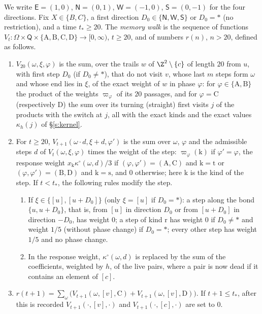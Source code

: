 We write $\mathsf E = (1, 0)$, $\mathsf N = (0, 1)$, $\mathsf W = (-1, 0)$, $\mathsf S = (0, -1)$ for the four directions. Fix $X \in \{B, C\}$, a first direction $D_0 \in \{\mathsf N, \mathsf W, \mathsf S\}$ or $D_0 = \ast$ (no restriction), and a time $t_* \ge 20$. The \emph{memory walk} is the sequence of functions $V_t \colon \Omega \times \mathsf Q \times \{\mathrm A, \mathrm B, \mathrm C, \mathrm D\} \to [0, \infty)$, $t \ge 20$, and of numbers $r(n)$, $n > 20$, defined as follows.
\begin{enumerate}
\item[(I)] $V_{20}(\omega, \xi, \varphi)$ is the sum, over the trails $w$ of $\Z^2 \setminus \{c\}$ of length $20$ from $u$, with first step $D_0$ (if $D_0 \neq \ast$), that do not visit $v$, whose last $m$ steps form $\omega$ and whose end lies in $\xi$, of the exact weight of $w$ in phase $\varphi$: for $\varphi \in \{\mathrm A, \mathrm B\}$ the product of the weights $\varpi_\varphi$ of its $20$ passages, and for $\varphi = \mathrm C$ (respectively $\mathrm D$) the sum over its turning (straight) first visits $j$ of the products with the switch at $j$, all with the exact kinds and the exact values $\kappa_h(j)$ of \S\ref{s:kernel}.
\item[(II)] For $t \ge 20$, $V_{t + 1}(\omega \cdot d, \xi + d, \varphi')$ is the sum over $\omega$, $\varphi$ and the admissible steps $d$ of $V_t(\omega, \xi, \varphi)$ times the weight of the step: $\varpi_\varphi(\mathrm k)$ if $\varphi' = \varphi$, the response weight $x_{\mathrm k} \kappa^\circ(\omega, d)/3$ if $(\varphi, \varphi') = (\mathrm A, \mathrm C)$ and $\mathrm k = \mathrm t$ or $(\varphi, \varphi') = (\mathrm B, \mathrm D)$ and $\mathrm k = \mathrm s$, and $0$ otherwise; here $\mathrm k$ is the kind of the step. If $t < t_*$, the following rules modify the step.
\begin{enumerate}
\item[(R1)] If $\xi \in \{[u], [u + D_0]\}$ (only $\xi = [u]$ if $D_0 = \ast$): a step along the bond $\{u, u + D_0\}$, that is, from $[u]$ in direction $D_0$ or from $[u + D_0]$ in direction $-D_0$, has weight $0$; a step of kind $\mathrm r$ has weight $0$ if $D_0 \neq \ast$ and weight $1/5$ (without phase change) if $D_0 = \ast$; every other step has weight $1/5$ and no phase change.
\item[(R2)] In the response weight, $\kappa^\circ(\omega, d)$ is replaced by the sum of the coefficients, weighted by $h$, of the live pairs, where a pair is now dead if it contains an element of $[c]$.
\end{enumerate}
\item[(III)] $r(t + 1) = \sum_\omega \bigl( V_{t + 1}(\omega, [v], \mathrm C) + V_{t + 1}(\omega, [v], \mathrm D) \bigr)$. If $t + 1 \le t_*$, after this is recorded $V_{t + 1}(\cdot, [v], \cdot)$ and $V_{t + 1}(\cdot, [c], \cdot)$ are set to $0$.
\end{enumerate}

